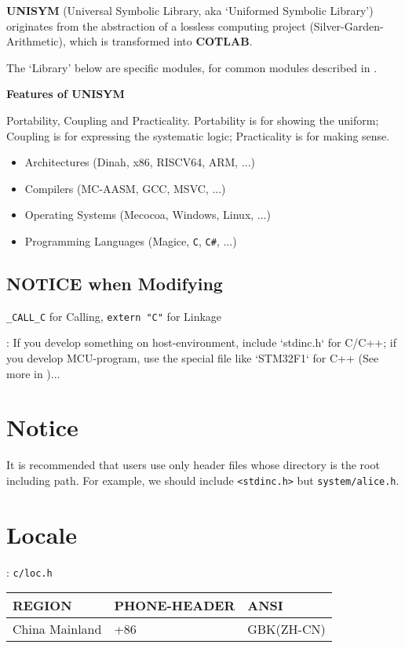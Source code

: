 

\textbf{UNISYM} (Universal Symbolic Library, aka `Uniformed Symbolic Library') originates from the abstraction of a lossless computing project (Silver-Garden-Arithmetic), which is transformed into \textbf{COTLAB}.

The `Library' below are specific modules, for common modules described in .

\textbf{Features of UNISYM}

Portability, Coupling and Practicality. Portability is for showing the uniform; Coupling is for expressing the systematic logic; Practicality is for making sense.

\begin{itemize}
\item Architectures (Dinah, x86, RISCV64, ARM, ...)
\item Compilers (MC-AASM, GCC, MSVC, ...)
\item Operating Systems (Mecocoa, Windows, Linux, ...)
\item Programming Languages (Magice, \verb|C|, \verb|C#|, ...)
\end{itemize}

\subsection{NOTICE when Modifying}

\verb`_CALL_C` for Calling, \verb`extern "C"` for Linkage


:
If you develop something on host-environment, include `stdinc.h` for C/C++;
if you develop MCU-program, use the special file like `STM32F1` for C++ (See more in )...

\section{Notice}

It is recommended that users use only header files whose directory is the root including path. For example, we should include \verb`<stdinc.h>` but \verb|system/alice.h|.


\section{Locale}
: \verb`c/loc.h`

\begin{center}\begin{table}[h!]
	\begin{tabular}{|l|l|l|}
	\hline
	\rowcolor[rgb]{0.95, 0.975, 1}\textbf{REGION} & \textbf{PHONE-HEADER} & \textbf{ANSI} \\ \hline
	China Mainland & +86 & GBK(ZH-CN) \\ \hline
	\end{tabular}
\end{table}\end{center}

